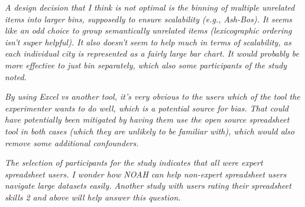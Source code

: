  \textit{A design decision that I think is not optimal is the binning of multiple unrelated
items into larger bins, supposedly to ensure scalability (e.g., Ash-Bos). It seems
like an odd choice to group semantically unrelated items (lexicographic ordering
isn't super helpful). It also doesn't seem to help much in terms of scalability, as each individual city is represented as a fairly large bar chart. It would
probably be more effective to just bin separately, which also some participants of the study noted.}


 \textit{By
using Excel vs another tool, it's very obvious to the users which of the tool the experimenter wants to do well, which is a potential source for bias. That could
have potentially been mitigated by having them use the open source spreadsheet tool in both cases (which they are unlikely to be familiar with), which would also
remove some additional confounders.}

  

 \textit{The selection of participants for the study indicates that all were expert
    spreadsheet users. I wonder how NOAH can help non-expert spreadsheet users
    navigate large datasets easily. Another study with users rating their spreadsheet
    skills 2 and above will help answer this question.}

 

